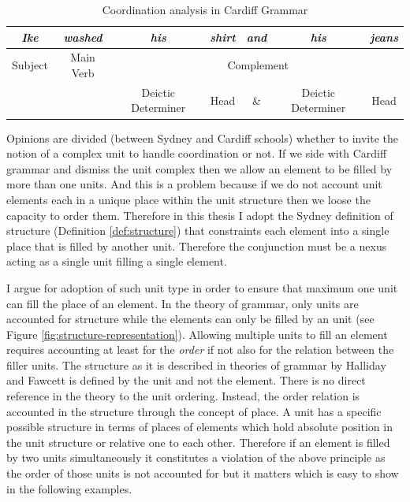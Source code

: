 \begin{table}[!ht]
	\centering
        \begin{tabular}{cc|c|c|c|c|c|}
            \hline
            \multicolumn{1}{|c|}{\textit{Ike}} & \textit{washed} & \textit{his}       & \textit{shirt} & \textit{and} & \textit{his}       & \textit{jeans} \\ \hline
            \multicolumn{1}{|c|}{Subject}      & Main Verb       & \multicolumn{5}{c|}{Complement}                                                          \\ \hline
             &  & Deictic Determiner & Head & \& & Deictic Determiner & Head \\ \cline{3-7} 
        \end{tabular}%
	\caption{Coordination analysis in Cardiff Grammar}
	\label{ex:Cardiff-example-analisys}
\end{table}

Opinions are divided (between Sydney and Cardiff schools) whether to invite the notion of a complex unit to handle coordination or not. If we side with Cardiff grammar and dismiss the unit complex then we allow an element to be filled by more than one units. And this is a problem because if we do not account unit elements each in a unique place within the unit structure then we loose the capacity to order them. Therefore in this thesis I adopt the Sydney definition of structure (Definition \ref{def:structure}) that constraints each element into a single place that is filled by another unit. Therefore the conjunction must be a nexus acting as a single unit filling a single element. 

I argue for adoption of such unit type in order to ensure that maximum one unit can fill the place of an element. In the theory of grammar, only units are accounted for structure while the elements can only be filled by an unit (see Figure \ref{fig:structure-representation}). Allowing multiple units to fill an element requires accounting at least for the \textit{order} if not also for the relation between the filler units. The structure as it is described in theories of grammar by Halliday \citep{Halliday2002} and Fawcett \citep{Fawcett2000} is defined by the unit and not the element. There is no direct reference in the theory to the unit ordering. Instead, the order relation is accounted in the structure through the concept of place. A unit has a specific possible structure in terms of places of elements which hold absolute position in the unit structure or relative one to each other. Therefore if an element is filled by two units simultaneously it constitutes a violation of the above principle as the order of those units is not accounted for but it matters which is easy to show in the following examples.

